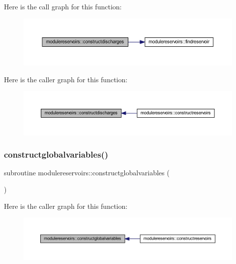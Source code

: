 Here is the call graph for this function\+:\nopagebreak
\begin{figure}[H]
\begin{center}
\leavevmode
\includegraphics[width=350pt]{namespacemodulereservoirs_a720deae8cfb3dc32643ce6afdfa4d187_cgraph}
\end{center}
\end{figure}
Here is the caller graph for this function\+:\nopagebreak
\begin{figure}[H]
\begin{center}
\leavevmode
\includegraphics[width=350pt]{namespacemodulereservoirs_a720deae8cfb3dc32643ce6afdfa4d187_icgraph}
\end{center}
\end{figure}
\mbox{\label{namespacemodulereservoirs_adb9f7b2b418dc95e774855d03c82b302}} 
\subsubsection{\texorpdfstring{constructglobalvariables()}{constructglobalvariables()}}
{\footnotesize\ttfamily subroutine modulereservoirs\+::constructglobalvariables (\begin{DoxyParamCaption}{ }\end{DoxyParamCaption})\hspace{0.3cm}{\ttfamily [private]}}

Here is the caller graph for this function\+:\nopagebreak
\begin{figure}[H]
\begin{center}
\leavevmode
\includegraphics[width=350pt]{namespacemodulereservoirs_adb9f7b2b418dc95e774855d03c82b302_icgraph}
\end{center}
\end{figure}
\mbox{\label{namespacemodulereservoirs_aa1585e14b10abec0e0a86d6b4674be9c}} 
